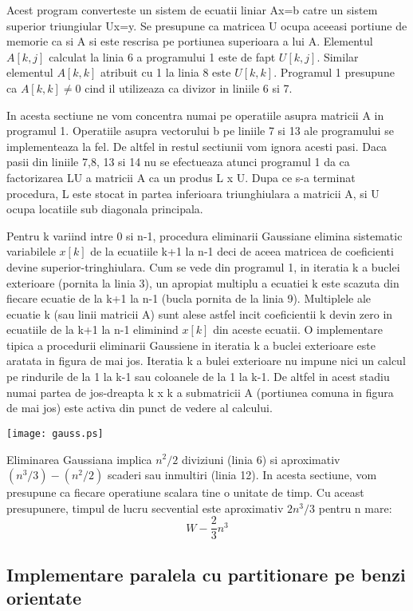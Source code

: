 Acest program converteste un sistem de ecuatii liniar Ax=b catre un sistem
superior triungiular Ux=y. Se presupune ca matricea U ocupa aceeasi portiune
de memorie ca si A si este rescrisa pe portiunea superioara a lui A.
Elementul $A[k,j]$ calculat la linia 6 a programului 1 este
de fapt $U[k,j]$. Similar elementul $A[k,k]$ atribuit cu 1 la linia 8 este
$U[k,k]$. Programul 1 presupune ca $A[k,k]\ne0$ cind il utilizeaza ca
divizor in liniile 6 si 7.

In acesta sectiune ne vom concentra numai pe operatiile asupra matricii A in
programul 1. Operatiile asupra vectorului b pe liniile 7 si 13 ale
programului se implementeaza la fel. De altfel in restul sectiunii vom
ignora acesti pasi. Daca pasii din liniile 7,8, 13 si 14 nu se efectueaza
atunci programul 1 da ca factorizarea LU a matricii A ca un produs L x U.
Dupa ce s-a terminat procedura, L este stocat in partea inferioara
triunghiulara a matricii A, si U ocupa locatiile sub diagonala principala.

Pentru k variind intre 0 si n-1, procedura eliminarii Gaussiane elimina
sistematic variabilele $x[k]$ de la ecuatiile k+1 la n-1 deci de aceea
matricea de coeficienti devine superior-tringhiulara. Cum se vede din
programul 1,  in iteratia k a buclei exterioare (pornita la linia 3), un
apropiat multiplu a ecuatiei k este scazuta din fiecare ecuatie de la k+1 la
n-1 (bucla pornita de la linia 9). Multiplele ale ecuatie k (sau linii
matricii A) sunt alese astfel incit coeficientii k devin zero in ecuatiile
de la k+1 la n-1 eliminind $x[k]$ din aceste ecuatii. O implementare tipica
a procedurii eliminarii Gaussiene in iteratia k a buclei exterioare este
aratata in figura de mai jos. Iteratia k a bulei exterioare nu impune nici
un calcul  pe rindurile de la 1 la k-1  sau coloanele de la 1 la k-1. De
altfel in acest stadiu numai partea de jos-dreapta k x k a submatricii A
(portiunea comuna in figura de mai jos) este activa din punct de vedere al
calcului.

\vspace*{5mm}
\texttt{[image: gauss.ps]}
\vspace*{5mm}


Eliminarea Gaussiana implica $n^2/2$ diviziuni (linia 6) si aproximativ
$(n^3/3)-(n^2/2)$ scaderi sau inmultiri (linia 12). In acesta sectiune, vom
presupune ca fiecare operatiune scalara tine o unitate de timp. Cu aceast
presupunere, timpul de lucru secvential este aproximativ $2n^3/3$ pentru n
mare:
$$W-\frac{2}{3}n^3$$

\subsection{Implementare paralela cu partitionare pe benzi orientate}

